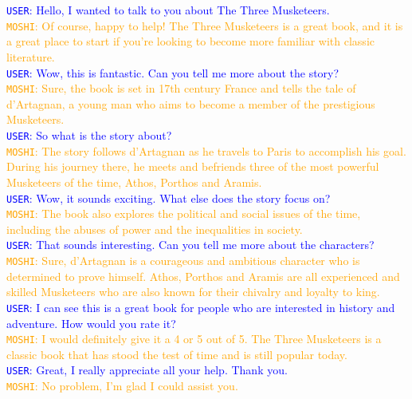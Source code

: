 \begin{tcolorbox}
\textcolor{blue}{\texttt{USER}: Hello, I wanted to talk to you about The Three Musketeers.} \\
\textcolor{orange}{\texttt{MOSHI}: Of course, happy to help! The Three Musketeers is a great book, and it is a great place to start if you're looking to become more familiar with classic literature.} \\
\textcolor{blue}{\texttt{USER}: Wow, this is fantastic. Can you tell me more about the story?} \\
\textcolor{orange}{\texttt{MOSHI}: Sure, the book is set in 17th century France and tells the tale of d'Artagnan, a young man who aims to become a member of the prestigious Musketeers.} \\
\textcolor{blue}{\texttt{USER}: So what is the story about?} \\
\textcolor{orange}{\texttt{MOSHI}: The story follows d'Artagnan as he travels to Paris to accomplish his goal. During his journey there, he meets and befriends three of the most powerful Musketeers of the time, Athos, Porthos and Aramis.} \\
\textcolor{blue}{\texttt{USER}: Wow, it sounds exciting. What else does the story focus on?} \\
\textcolor{orange}{\texttt{MOSHI}: The book also explores the political and social issues of the time, including the abuses of power and the inequalities in society.} \\
\textcolor{blue}{\texttt{USER}: That sounds interesting. Can you tell me more about the characters?} \\
\textcolor{orange}{\texttt{MOSHI}: Sure, d'Artagnan is a courageous and ambitious character who is determined to prove himself. Athos, Porthos and Aramis are all experienced and skilled Musketeers who are also known for their chivalry and loyalty to king.} \\
\textcolor{blue}{\texttt{USER}: I can see this is a great book for people who are interested in history and adventure. How would you rate it?} \\
\textcolor{orange}{\texttt{MOSHI}: I would definitely give it a 4 or 5 out of 5. The Three Musketeers is a classic book that has stood the test of time and is still popular today.} \\
\textcolor{blue}{\texttt{USER}: Great, I really appreciate all your help. Thank you.} \\
\textcolor{orange}{\texttt{MOSHI}: No problem, I'm glad I could assist you.} \\
\end{tcolorbox}

